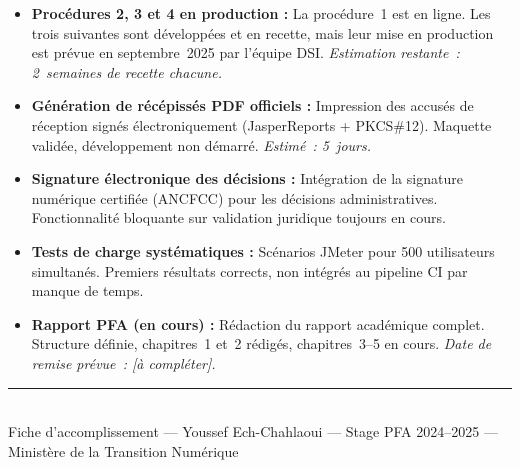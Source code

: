 \documentclass[a4paper,11pt]{article}
\begin{document}
\begin{itemize}
  \item \textbf{Proc\'{e}dures 2, 3 et 4 en production :}
        La proc\'{e}dure~1 est en ligne. Les trois suivantes sont d\'{e}velopp\'{e}es et
        en recette, mais leur mise en production est pr\'{e}vue en septembre~2025
        par l'\'{e}quipe DSI. \textit{Estimation restante~: 2~semaines de recette chacune.}

  \item \textbf{G\'{e}n\'{e}ration de r\'{e}c\'{e}piss\'{e}s PDF officiels :}
        Impression des accusés de réception signés \'{e}lectroniquement (JasperReports + PKCS\#12).
        Maquette valid\'{e}e, d\'{e}veloppement non d\'{e}marr\'{e}.
        \textit{Estim\'{e}~: 5~jours.}

  \item \textbf{Signature \'{e}lectronique des d\'{e}cisions :}
        Int\'{e}gration de la signature num\'{e}rique certifi\'{e}e (ANCFCC)
        pour les d\'{e}cisions administratives. Fonctionnalit\'{e} bloquante
        sur validation juridique toujours en cours.

  \item \textbf{Tests de charge syst\'{e}matiques :}
        Sc\'{e}narios JMeter pour 500 utilisateurs simultan\'{e}s.
        Premiers r\'{e}sultats corrects, non int\'{e}gr\'{e}s au pipeline CI
        par manque de temps.

  \item \textbf{Rapport PFA (en cours) :}
        R\'{e}daction du rapport acad\'{e}mique complet.
        Structure d\'{e}finie, chapitres~1 et~2 r\'{e}dig\'{e}s,
        chapitres~3--5 en cours.
        \textit{Date de remise pr\'{e}vue~: [à compléter].}
\end{itemize}

\vfill
\begin{center}
  \rule{9cm}{0.4pt}\\[4pt]
  {\small\color{InstitGrey}\sffamily
    Fiche d'accomplissement --- Youssef Ech-Chahlaoui ---
    Stage PFA 2024--2025 --- Minist\`{e}re de la Transition Num\'{e}rique}
\end{center}
\end{document}
